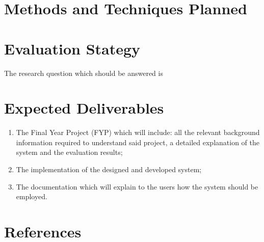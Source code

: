 \documentclass{csfyp}
\begin{document}
\section{Methods and Techniques Planned}



\section{Evaluation Stategy}

The research question which should be answered is


\section{Expected Deliverables}

\begin{enumerate}

  \item The Final Year Project (FYP) which will include: all the relevant background information required to understand said project, a detailed explanation of the system and the evaluation results; 

  \item The implementation of the designed and developed system;

  \item The documentation which will explain to the users how the system should be employed. 

\end{enumerate}


\section{References}


\nocite{*}

\end{document}
